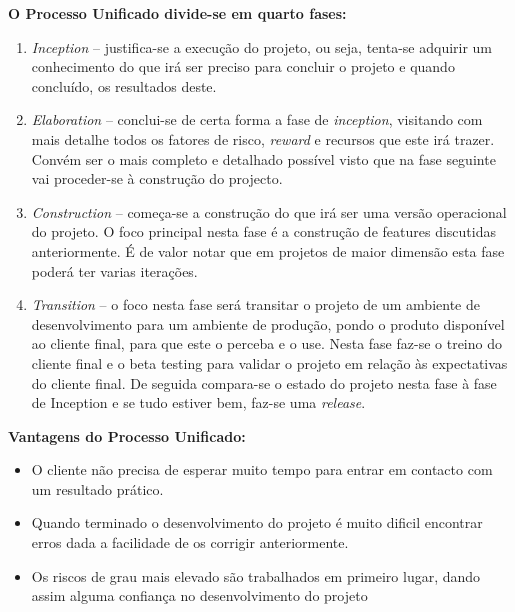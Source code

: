 \documentclass[12pt, a4paper, twoside]{report} %
\begin{document}
\clearpage

\textbf{O Processo Unificado divide-se em quarto fases:}
\\

\begin{enumerate}
\item \textit{Inception} – justifica-se a execução do projeto, ou seja, tenta-se adquirir um conhecimento do que irá ser preciso para concluir o projeto e quando concluído, os resultados deste.

\item \textit{Elaboration} – conclui-se de certa forma a fase de \textit{inception}, visitando com mais detalhe todos os fatores de risco, \textit{reward} e recursos que este irá trazer. Convém ser o mais completo e detalhado possível visto que na fase seguinte vai proceder-se à construção do projecto.

\item \textit{Construction} – começa-se a construção do que irá ser uma versão operacional do projeto. O foco principal nesta fase é a construção de features discutidas anteriormente. É de valor notar que em projetos de maior dimensão esta fase poderá ter varias iterações.

\item \textit{Transition} – o foco nesta fase será transitar o projeto de um ambiente de desenvolvimento para um ambiente de produção, pondo o produto disponível ao cliente final, para que este o perceba e o use. Nesta fase faz-se o treino do cliente final e o beta testing para validar o projeto em relação às expectativas do cliente final. De seguida compara-se o estado do projeto nesta fase à fase de Inception e se tudo estiver bem, faz-se uma \textit{release}.

\end{enumerate}

\textbf{Vantagens do Processo Unificado:}
\begin{itemize}
\item O cliente não precisa de esperar muito tempo para entrar em contacto com um resultado prático.
\item Quando terminado o desenvolvimento do projeto é muito dificil encontrar erros dada a facilidade de os corrigir anteriormente.
\item Os riscos de grau mais elevado são trabalhados em primeiro lugar, dando assim alguma confiança no desenvolvimento do projeto
\end{itemize}
\end{document}
